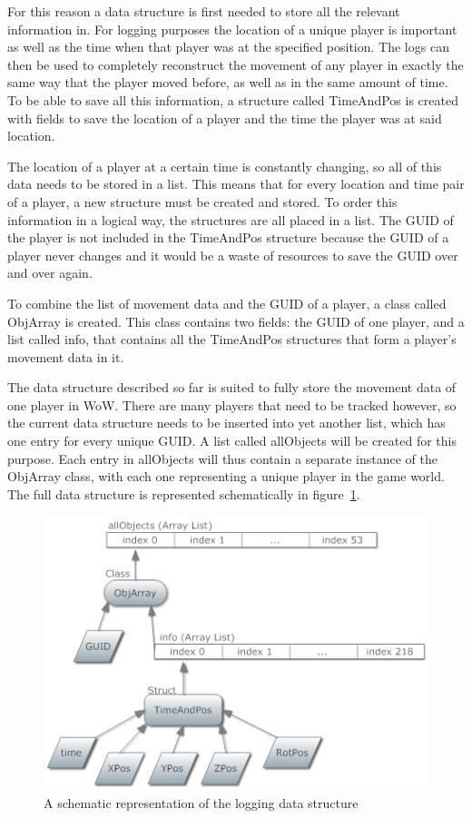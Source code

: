 For this reason a data structure is first needed to store all the relevant information in. For logging purposes the location of a unique player is important as well as the time when that player was at the specified position. The logs can then be used to completely reconstruct the movement of any player in exactly the same way that the player moved before, as well as in the same amount of time. To be able to save all this information, a structure called TimeAndPos is created with fields to save the location of a player and the time the player was at said location. 


The location of a player at a certain time is constantly changing, so all of this data needs to be stored in a list. This means that for every location and time pair of a player, a new structure must be created and stored. To order this information in a logical way, the structures are all placed in a list. The GUID of the player is not included in the TimeAndPos structure because the GUID of a player never changes and it would be a waste of resources to save the GUID over and over again.

To combine the list of movement data and the GUID of a player, a class called ObjArray is created. This class contains two fields: the GUID of one player, and a list called info, that contains all the TimeAndPos structures that form  a player's movement data in it.

The data structure described so far is suited to fully store the movement data of one player in WoW. There are many players that need to be tracked however, so the current data structure needs to be inserted into yet another list, which has one entry for every unique GUID.
A list called allObjects will be created for this purpose. Each entry in allObjects will thus contain a separate instance of the ObjArray class, with each one representing a unique player in the game world. The full data structure is represented schematically in figure~\ref{loggingstruct}.


\begin{figure}[htbp]  %
\centering
\includegraphics[scale = 0.65]{arrays.jpg}	
\caption{A schematic representation of the logging data structure}
\label{loggingstruct}
\end{figure}

